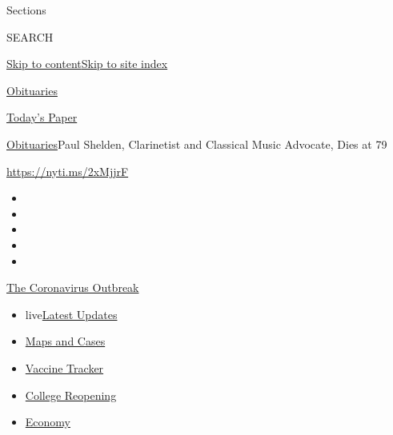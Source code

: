 Sections

SEARCH

\protect\hyperlink{site-content}{Skip to
content}\protect\hyperlink{site-index}{Skip to site index}

\href{https://www.nytimes3xbfgragh.onion/section/obituaries}{Obituaries}

\href{https://myaccount.nytimes3xbfgragh.onion/auth/login?response_type=cookie\&client_id=vi}{}

\href{https://www.nytimes3xbfgragh.onion/section/todayspaper}{Today's
Paper}

\href{/section/obituaries}{Obituaries}\textbar{}Paul Shelden,
Clarinetist and Classical Music Advocate, Dies at 79

\url{https://nyti.ms/2xMjjrF}

\begin{itemize}
\item
\item
\item
\item
\item
\end{itemize}

\href{https://www.nytimes3xbfgragh.onion/news-event/coronavirus?action=click\&pgtype=Article\&state=default\&region=TOP_BANNER\&context=storylines_menu}{The
Coronavirus Outbreak}

\begin{itemize}
\tightlist
\item
  live\href{https://www.nytimes3xbfgragh.onion/2020/08/04/world/coronavirus-covid-19.html?action=click\&pgtype=Article\&state=default\&region=TOP_BANNER\&context=storylines_menu}{Latest
  Updates}
\item
  \href{https://www.nytimes3xbfgragh.onion/interactive/2020/us/coronavirus-us-cases.html?action=click\&pgtype=Article\&state=default\&region=TOP_BANNER\&context=storylines_menu}{Maps
  and Cases}
\item
  \href{https://www.nytimes3xbfgragh.onion/interactive/2020/science/coronavirus-vaccine-tracker.html?action=click\&pgtype=Article\&state=default\&region=TOP_BANNER\&context=storylines_menu}{Vaccine
  Tracker}
\item
  \href{https://www.nytimes3xbfgragh.onion/2020/08/02/us/covid-college-reopening.html?action=click\&pgtype=Article\&state=default\&region=TOP_BANNER\&context=storylines_menu}{College
  Reopening}
\item
  \href{https://www.nytimes3xbfgragh.onion/live/2020/08/03/business/stock-market-today-coronavirus?action=click\&pgtype=Article\&state=default\&region=TOP_BANNER\&context=storylines_menu}{Economy}
\end{itemize}

